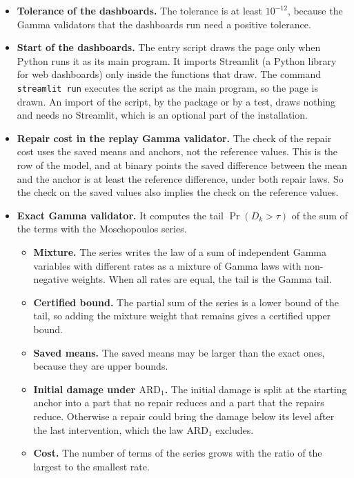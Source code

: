 \documentclass[11pt,a4paper]{article}
\theoremstyle{plain}
\theoremstyle{definition}
\theoremstyle{remark}
\begin{document}
\begin{itemize}
    The structural validator does not compare the models.
    The margins and the Gamma validators need the parameters that the input gives for the model of each component, and the structural validator needs no model.
  \item \textbf{Tolerance of the dashboards.} The tolerance is at least $10^{-12}$, because the Gamma validators that the dashboards run need a positive tolerance.
  \item \textbf{Start of the dashboards.} The entry script draws the page only when Python runs it as its main program.
    It imports Streamlit (a Python library for web dashboards) only inside the functions that draw.
    The command \texttt{streamlit run} executes the script as the main program, so the page is drawn.
    An import of the script, by the package or by a test, draws nothing and needs no Streamlit, which is an optional part of the installation.
  \item \textbf{Repair cost in the replay Gamma validator.} The check of the repair cost uses the saved means and anchors, not the reference values.
    This is the row of the model, and at binary points the saved difference between the mean and the anchor is at least the reference difference, under both repair laws.
    So the check on the saved values also implies the check on the reference values.
  \item \textbf{Exact Gamma validator.} It computes the tail $\Pr(D_k > \tau)$ of the sum of the terms with the Moschopoulos series.
    \begin{itemize}
      \item \textbf{Mixture.} The series writes the law of a sum of independent Gamma variables with different rates as a mixture of Gamma laws with non-negative weights.
        When all rates are equal, the tail is the Gamma tail.
      \item \textbf{Certified bound.} The partial sum of the series is a lower bound of the tail, so adding the mixture weight that remains gives a certified upper bound.
      \item \textbf{Saved means.} The saved means may be larger than the exact ones, because they are upper bounds.
      \item \textbf{Initial damage under $\text{ARD}_1$.} The initial damage is split at the starting anchor into a part that no repair reduces and a part that the repairs reduce.
        Otherwise a repair could bring the damage below its level after the last intervention, which the law $\text{ARD}_1$ excludes.
      \item \textbf{Cost.} The number of terms of the series grows with the ratio of the largest to the smallest rate.

\end{itemize}
\end{itemize}
\end{document}
